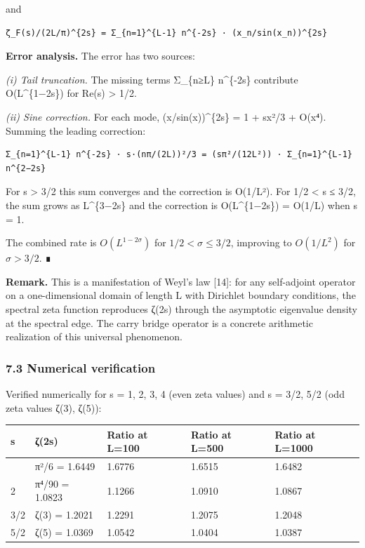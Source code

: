\documentclass[
  11pt,
]{article}
\begin{document}
and

\begin{verbatim}
ζ_F(s)/(2L/π)^{2s} = Σ_{n=1}^{L-1} n^{-2s} · (x_n/sin(x_n))^{2s}
\end{verbatim}

\textbf{Error analysis.} The error has two sources:

\emph{(i) Tail truncation.} The missing terms Σ\_\{n≥L\} n\^{}\{-2s\} contribute
O(L\^{}\{1−2s\}) for Re(s) \textgreater{} 1/2.

\emph{(ii) Sine correction.} For each mode, (x/sin(x))\^{}\{2s\} = 1 + sx²/3 +
O(x⁴). Summing the leading correction:

\begin{verbatim}
Σ_{n=1}^{L-1} n^{-2s} · s·(nπ/(2L))²/3 = (sπ²/(12L²)) · Σ_{n=1}^{L-1} n^{2−2s}
\end{verbatim}

For s \textgreater{} 3/2 this sum converges and the correction is O(1/L²). For
1/2 \textless{} s ≤ 3/2, the sum grows as L\^{}\{3−2s\} and the correction is
O(L\^{}\{1−2s\}) = O(1/L) when s = 1.

The combined rate is \(O(L^{1-2\sigma})\) for \(1/2 < \sigma \leq 3/2\),
improving to \(O(1/L^2)\) for \(\sigma > 3/2\). ∎

\textbf{Remark.} This is a manifestation of Weyl's law {[}14{]}: for any
self-adjoint operator on a one-dimensional domain of length L with Dirichlet
boundary conditions, the spectral zeta function reproduces ζ(2s) through the
asymptotic eigenvalue density at the spectral edge. The carry bridge operator is
a concrete arithmetic realization of this universal phenomenon.

\subsubsection{7.3 Numerical verification}\label{numerical-verification}

Verified numerically for s = 1, 2, 3, 4 (even zeta values) and s = 3/2, 5/2 (odd
zeta values ζ(3), ζ(5)):

\begin{longtable}[]{@{}lllll@{}}
\toprule\noalign{}
s & ζ(2s) & Ratio at L=100 & Ratio at L=500 & Ratio at L=1000 \\
\midrule\noalign{}
\endhead
\bottomrule\noalign{}
\endlastfoot
1 & π²/6 = 1.6449 & 1.6776 & 1.6515 & 1.6482 \\
2 & π⁴/90 = 1.0823 & 1.1266 & 1.0910 & 1.0867 \\
3/2 & ζ(3) = 1.2021 & 1.2291 & 1.2075 & 1.2048 \\
5/2 & ζ(5) = 1.0369 & 1.0542 & 1.0404 & 1.0387 \\
\end{longtable}
\end{document}
